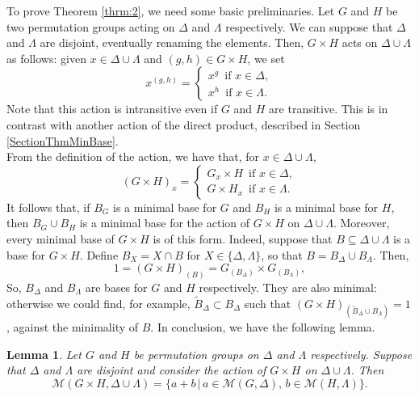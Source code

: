 \documentclass{amsart}
\newtheorem{lemma}[theorem]{Lemma}
\begin{document}
	To prove Theorem \ref{thrm:2}, we need some basic preliminaries. Let $G$ and $H$ be two permutation groups acting on $\Delta$ and $\Lambda$ respectively. We can suppose that $\Delta$ and $\Lambda$ are disjoint, eventually renaming the elements. Then, $G \times H$ acts on $\Delta \cup \Lambda$ as follows: given $x \in \Delta \cup \Lambda$ and $(g,h) \in G \times H$, we set 
	\[
		x^{(g,h)} = 
		\begin{cases}
			x^g \, \text{ if } x \in \Delta, \\
			x^h \, \text{ if } x \in \Lambda.
		\end{cases}
	\]
	Note that this action is intransitive even if $G$ and $H$ are transitive. This is in contrast with another action of the direct product, described in Section \ref{SectionThmMinBase}.\\
	From the definition of the action, we have that, for $x \in \Delta \cup \Lambda$,
	\[
		(G \times H)_x = 
		\begin{cases}
			G_x \times H \, \text{ if } x \in \Delta, \\
			G \times H_x \, \text{ if } x \in \Lambda.
		\end{cases}
	\]
	It follows that, if $B_G$ is a minimal base for $G$ and $B_H$ is a minimal base for $H$, then $B_G \cup B_H$ is a minimal base for the action of $G \times H$ on $\Delta \cup \Lambda$. Moreover, every minimal base of $G \times H$ is of this form. Indeed, suppose that $B \subseteq \Delta \cup \Lambda$ is a base for $G \times H$. Define $B_X = X \cap B$ for $X \in \{\Delta, \Lambda\}$, so that $B = B_\Delta \cup B_\Lambda$. Then,
	\[
		1 = (G \times H)_{(B)} = G_{(B_\Delta)} \times G_{(B_\Lambda)},
	\]
	So, $B_\Delta$ and $B_\Lambda$ are bases for $G$ and $H$ respectively. They are also minimal: otherwise we could find, for example, $\tilde{B}_\Delta \subset B_\Delta$ such that $(G \times H)_{(\tilde{B}_\Delta \cup B_\Lambda)}=1$, against the minimality of $B$. In conclusion, we have the following lemma.
	\begin{lemma}
		\label{lemmaSumBase}
		Let $G$ and $H$ be permutation groups on $\Delta$ and $\Lambda$ respectively. Suppose that $\Delta$ and $\Lambda$ are disjoint and consider the action of $G \times H$ on $\Delta \cup \Lambda$. Then
		\[
			\mathcal{M}(G \times H,\Delta\cup \Lambda) = \{a+b \, | \, a \in \mathcal{M}(G,\Delta), \, b \in \mathcal{M}(H,\Lambda)\}.
		\]
	\end{lemma}
	
\end{document}
